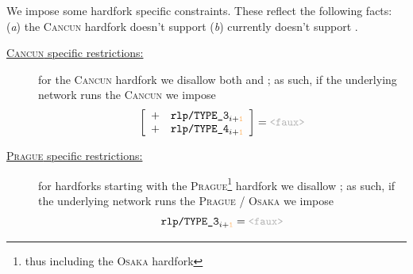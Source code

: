 We impose some hardfork specific constraints.
These reflect the following facts:
(\emph{a}) the \textsc{Cancun} hardfork doesn't support 
(\emph{b}) \linea{} currently doesn't support .
\begin{description}
	\item[\underline{\textsc{Cancun} specific restrictions:}]
		for the \textsc{Cancun} hardfork we disallow both
		 and
		;
		as such, if the underlying network runs the \textsc{Cancun} \evm{} we impose
		\[
			\left[ \begin{array}{cl}
				+ & \txnDataRlpIsBlobTransaction              _{i + \rlpViewRowOffset} \\
				+ & \txnDataRlpIsAccountDelegationTransaction _{i + \rlpViewRowOffset} \\
			\end{array} \right]
			=
			\false
		\]
	\item[\underline{\textsc{Prague} specific restrictions:}]
		for hardforks starting with the \textsc{Prague}\footnote{thus including the \textsc{Osaka} hardfork} hardfork we disallow
		;
		as such, if the underlying network runs the \textsc{Prague} / \textsc{Osaka} \evm{} we impose
		\[
			\txnDataRlpIsBlobTransaction _{i + \rlpViewRowOffset}
			=
			\false
		\]
\end{description}
